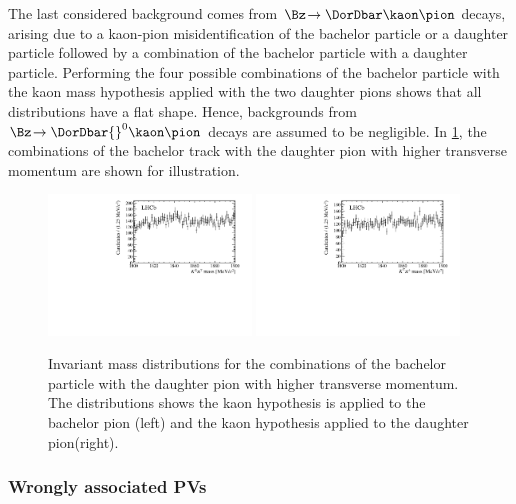 The last considered background comes from $\Bz\!\to\DorDbar\kaon\pion$ decays, arising due to a kaon-pion misidentification of the bachelor particle or a \Dm daughter particle followed by a combination of the bachelor particle with a \Dm daughter particle.
Performing the four possible combinations of the bachelor particle with the kaon mass hypothesis applied with the two \Dm daughter pions shows that all distributions have a flat shape.
Hence, backgrounds from $\Bz\!\to\DorDbar{}^0\kaon\pion$ decays are assumed to be negligible.
In \cref{fig:DzVeto}, the combinations of the bachelor track with the \Dm daughter pion with higher transverse momentum are shown for illustration.
\begin{figure}[tbp]
    \centering
    \includegraphics[width=0.48\textwidth]{06selection/figs/D0Hypo3.pdf}
    \includegraphics[width=0.48\textwidth]{06selection/figs/D0Hypo4.pdf}
    \caption{Invariant mass distributions for the combinations of the bachelor particle with the \Dm daughter pion with higher transverse momentum.
    The distributions shows the kaon hypothesis is applied to the bachelor pion (left) and the kaon hypothesis applied to the \Dm daughter pion(right).}
    \label{fig:DzVeto}
\end{figure}

\subsubsection*{Wrongly associated PVs}

